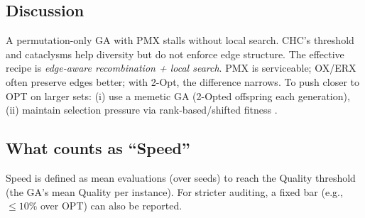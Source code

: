 \documentclass{article}
\begin{document}
\subsection{Discussion}
A permutation-only GA with PMX stalls without local search. CHC’s threshold and cataclysms help diversity but do not enforce edge structure. The effective recipe is \emph{edge-aware recombination + local search}. PMX is serviceable; OX/ERX often preserve edges better; with 2-Opt, the difference narrows. To push closer to OPT on larger sets: (i) use a memetic GA (2-Opted offspring each generation), (ii) maintain selection pressure via rank-based/shifted fitness \cite{potvin1996gaTSP,johnson1997tspLocal,nagata2013eax}.

\subsection{What counts as ``Speed''}
Speed is defined as mean evaluations (over seeds) to reach the Quality threshold (the GA’s mean Quality per instance). For stricter auditing, a fixed bar (e.g., $\le 10\%$ over OPT) can also be reported.
\end{document}
